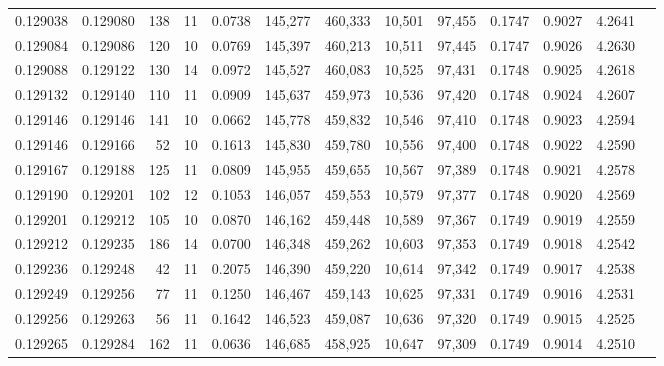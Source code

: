 \begin{tabular}{rrrrrrrrrrrrr}
0.129038 & 0.129080 &   138 &  11 &                                     0.0738 & 145,277 & 460,333 &  10,501 &  97,455 & 0.1747 & 0.9027 & 4.2641 \\
0.129084 & 0.129086 &   120 &  10 &                                     0.0769 & 145,397 & 460,213 &  10,511 &  97,445 & 0.1747 & 0.9026 & 4.2630 \\
0.129088 & 0.129122 &   130 &  14 &                                     0.0972 & 145,527 & 460,083 &  10,525 &  97,431 & 0.1748 & 0.9025 & 4.2618 \\
0.129132 & 0.129140 &   110 &  11 &                                     0.0909 & 145,637 & 459,973 &  10,536 &  97,420 & 0.1748 & 0.9024 & 4.2607 \\
0.129146 & 0.129146 &   141 &  10 &                                     0.0662 & 145,778 & 459,832 &  10,546 &  97,410 & 0.1748 & 0.9023 & 4.2594 \\
0.129146 & 0.129166 &    52 &  10 &                                     0.1613 & 145,830 & 459,780 &  10,556 &  97,400 & 0.1748 & 0.9022 & 4.2590 \\
0.129167 & 0.129188 &   125 &  11 &                                     0.0809 & 145,955 & 459,655 &  10,567 &  97,389 & 0.1748 & 0.9021 & 4.2578 \\
0.129190 & 0.129201 &   102 &  12 &                                     0.1053 & 146,057 & 459,553 &  10,579 &  97,377 & 0.1748 & 0.9020 & 4.2569 \\
0.129201 & 0.129212 &   105 &  10 &                                     0.0870 & 146,162 & 459,448 &  10,589 &  97,367 & 0.1749 & 0.9019 & 4.2559 \\
0.129212 & 0.129235 &   186 &  14 &                                     0.0700 & 146,348 & 459,262 &  10,603 &  97,353 & 0.1749 & 0.9018 & 4.2542 \\
0.129236 & 0.129248 &    42 &  11 &                                     0.2075 & 146,390 & 459,220 &  10,614 &  97,342 & 0.1749 & 0.9017 & 4.2538 \\
0.129249 & 0.129256 &    77 &  11 &                                     0.1250 & 146,467 & 459,143 &  10,625 &  97,331 & 0.1749 & 0.9016 & 4.2531 \\
0.129256 & 0.129263 &    56 &  11 &                                     0.1642 & 146,523 & 459,087 &  10,636 &  97,320 & 0.1749 & 0.9015 & 4.2525 \\
0.129265 & 0.129284 &   162 &  11 &                                     0.0636 & 146,685 & 458,925 &  10,647 &  97,309 & 0.1749 & 0.9014 & 4.2510 \\

\end{tabular}
